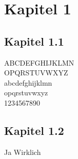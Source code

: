 
\section{Kapitel 1}

\subsection{Kapitel 1.1}

ABCDEFGHIJKLMN\\OPQRSTUVWXYZ\\
abcdefghijklmn\\opqrstuvwxyz\\
1234567890

\subsection{Kapitel 1.2}
Ja Wirklich